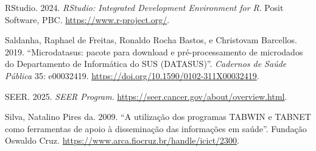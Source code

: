 \documentclass[
  brazilian,
  a4paper,
  oneside]{scrbook}
\newlength{\cslhangindent}
\newenvironment{CSLReferences}[2] %
 {\begin{list}{}{%
  \setlength{\itemindent}{0pt}
  \setlength{\leftmargin}{0pt}
  \setlength{\parsep}{0pt}
  \ifodd #1
   \setlength{\leftmargin}{\cslhangindent}
   \setlength{\itemindent}{-1\cslhangindent}
  \fi
  \setlength{\itemsep}{#2\baselineskip}}}
 {\end{list}}
\begin{document}
\begin{CSLReferences}{1}{1}
RStudio. 2024. \emph{{RStudio}: Integrated Development Environment for
{R}}. Posit Software, PBC. \url{https://www.r-project.org/}.

Saldanha, Raphael de Freitas, Ronaldo Rocha Bastos, e Christovam
Barcellos. 2019. {``Microdatasus: pacote para download e
pré-processamento de microdados do Departamento de Informática do {SUS}
({DATASUS})''}. \emph{Cadernos de Saúde Pública} 35: e00032419.
\url{https://doi.org/10.1590/0102-311X00032419}.

SEER. 2025. \emph{{SEER} Program}.
\url{https://seer.cancer.gov/about/overview.html}.

Silva, Natalino Pires da. 2009. {``A utilização dos programas {TABWIN} e
{TABNET} como ferramentas de apoio à disseminação das informações em
saúde''}. Fundação Oswaldo Cruz.
\url{https://www.arca.fiocruz.br/handle/icict/2300}.

\end{CSLReferences}


\backmatter
\end{document}
